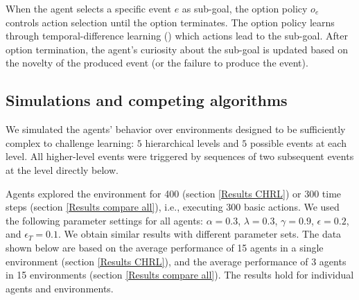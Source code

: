 \documentclass{article}
\begin{document}
When the agent selects a specific event $e$ as sub-goal, the option policy $o_e$ controls action selection until the option terminates. The option policy learns through temporal-difference learning (\cite{sutton_reinforcement_2017}) which actions lead to the sub-goal. After option termination, the agent's curiosity about the sub-goal is updated based on the novelty of the produced event (or the failure to produce the event).


\subsection{Simulations and competing algorithms} \label{Comparison agents}

We simulated the agents' behavior over environments designed to be sufficiently complex to challenge learning: $5$ hierarchical levels and $5$ possible events at each level. All higher-level events were triggered by sequences of two subsequent events at the level directly below.%

Agents explored the environment for 400 (section \ref{Results CHRL}) or 300 time steps (section \ref{Results compare all}), i.e., executing 300 basic actions. We used the following parameter settings for all agents: $\alpha = 0.3$, $\lambda = 0.3$, $\gamma = 0.9$, $\epsilon = 0.2$, and $\epsilon_T = 0.1$. We obtain similar results with different parameter sets. The data shown below are based on the average performance of 15 agents in a single environment (section \ref{Results CHRL}), and the average performance of 3 agents in 15 environments (section \ref{Results compare all}). The results hold for individual agents and environments.
\end{document}
